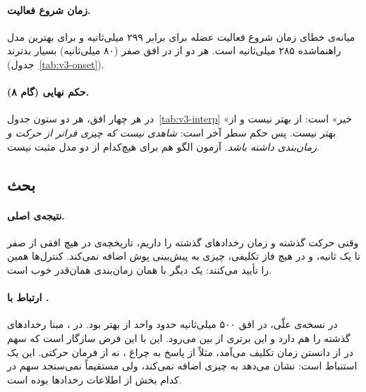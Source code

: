 \begin{table}[H]
\centering
\caption{کنترل‌های مدل  روی سری‌های آزمون، میانگین ۱۲ نفر. مدل‌های راهنماشده عددهای تقریباً یکسانی دارند. $p$ برای جابه‌جایی‌ها از آزمون  روی افت $r$ است، و برای  از آزمون یک‌طرفه در برابر  جابه‌جایی زمانی.}
\label{tab:v3-student-controls}
\resizebox{\textwidth}{!}{}
\end{table}

\paragraph{زمان شروع فعالیت.} میانه‌ی خطای زمان شروع فعالیت عضله برای  برابر ۲۹۹ میلی‌ثانیه و برای بهترین مدل راهنماشده ۲۸۵ میلی‌ثانیه است. هر دو از  در افق صفر (۸۰ میلی‌ثانیه) بسیار بدترند (جدول~\ref{tab:v3-onset}).

\paragraph{حکم نهایی (گام ۸).} در هر چهار افق، هر دو ستون جدول~\ref{tab:v3-interp} «خیر» است:  از  بهتر نیست و  از  بهتر نیست. پس حکم سطر آخر است: \emph{شاهدی نیست که  چیزی فراتر از حرکت و زمان‌بندی داشته باشد.} آزمون الگو هم برای هیچ‌کدام از دو مدل مثبت نیست.

\subsection{بحث}

\paragraph{نتیجه‌ی اصلی.} وقتی حرکت گذشته و زمان رخدادهای گذشته را داریم، تاریخچه‌ی  در هیچ افقی از صفر تا یک ثانیه، و در هیچ فاز تکلیفی، چیزی به پیش‌بینی پوش  اضافه نمی‌کند. کنترل‌ها همین را تأیید می‌کنند:  یک  دیگر با همان زمان‌بندی همان‌قدر خوب است.

\paragraph{ارتباط با .} در  نسخه‌ی علّی،  در افق ۵۰۰ میلی‌ثانیه حدود  واحد  از  بهتر بود. در ، مبنا رخدادهای گذشته را هم دارد و این برتری از بین می‌رود. این با این فرض سازگار است که سهم  در  از دانستن زمان تکلیف می‌آمد، مثلاً از پاسخ  به چراغ ، نه از فرمان حرکتی. این یک استنباط است:  نشان می‌دهد  به  چیزی اضافه نمی‌کند، ولی مستقیماً نمی‌سنجد سهم  در  کدام بخش از اطلاعات رخدادها بوده است.

